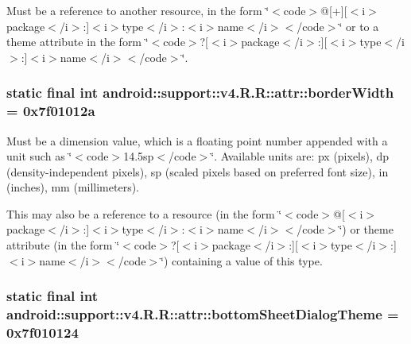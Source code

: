 Must be a reference to another resource, in the form \char`\"{}$<$code$>$@\mbox{[}+\mbox{]}\mbox{[}$<$i$>$package$<$/i$>$:\mbox{]}$<$i$>$type$<$/i$>$:$<$i$>$name$<$/i$>$$<$/code$>$\char`\"{} or to a theme attribute in the form \char`\"{}$<$code$>$?\mbox{[}$<$i$>$package$<$/i$>$:\mbox{]}\mbox{[}$<$i$>$type$<$/i$>$:\mbox{]}$<$i$>$name$<$/i$>$$<$/code$>$\char`\"{}. \hypertarget{classandroid_1_1support_1_1v4_1_1_r_1_1attr_3c18c05be92e6c88eb90139155411f3d}{
\subsubsection[{borderWidth}]{\setlength{\rightskip}{0pt plus 5cm}static final int android::support::v4.R.R::attr::borderWidth = 0x7f01012a}}
\label{classandroid_1_1support_1_1v4_1_1_r_1_1attr_3c18c05be92e6c88eb90139155411f3d}


Must be a dimension value, which is a floating point number appended with a unit such as \char`\"{}$<$code$>$14.5sp$<$/code$>$\char`\"{}. Available units are: px (pixels), dp (density-independent pixels), sp (scaled pixels based on preferred font size), in (inches), mm (millimeters). 

This may also be a reference to a resource (in the form \char`\"{}$<$code$>$@\mbox{[}$<$i$>$package$<$/i$>$:\mbox{]}$<$i$>$type$<$/i$>$:$<$i$>$name$<$/i$>$$<$/code$>$\char`\"{}) or theme attribute (in the form \char`\"{}$<$code$>$?\mbox{[}$<$i$>$package$<$/i$>$:\mbox{]}\mbox{[}$<$i$>$type$<$/i$>$:\mbox{]}$<$i$>$name$<$/i$>$$<$/code$>$\char`\"{}) containing a value of this type. \hypertarget{classandroid_1_1support_1_1v4_1_1_r_1_1attr_323be274dced1d9cfd3e0aeddccb214e}{
\subsubsection[{bottomSheetDialogTheme}]{\setlength{\rightskip}{0pt plus 5cm}static final int android::support::v4.R.R::attr::bottomSheetDialogTheme = 0x7f010124}}
\label{classandroid_1_1support_1_1v4_1_1_r_1_1attr_323be274dced1d9cfd3e0aeddccb214e}


